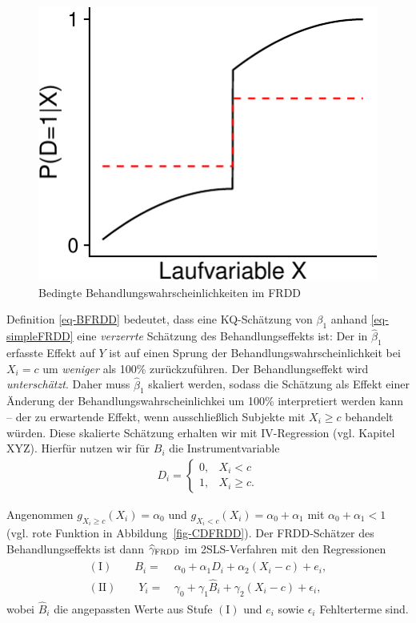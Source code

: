 \documentclass[
  a4paper,
  DIV=11,
  oneside]{scrreprt}
\begin{document}
\begin{figure}[t]

{\centering \includegraphics{RDD_files/figure-pdf/fig-FRDDprobD-1.pdf}

}

\caption{\label{fig-FRDDprobD}Bedingte Behandlungswahrscheinlichkeiten
im FRDD}

\end{figure}

Definition \eqref{eq-BFRDD} bedeutet, dass eine KQ-Schätzung von
\(\beta_1\) anhand \eqref{eq-simpleFRDD} eine \emph{verzerrte} Schätzung
des Behandlungseffekts ist: Der in \(\widehat{\beta}_1\) erfasste Effekt
auf \(Y\) ist auf einen Sprung der Behandlungswahrscheinlichkeit bei
\(X_i = c\) um \emph{weniger} als 100\% zurückzuführen. Der
Behandlungseffekt wird \emph{unterschätzt}. Daher muss
\(\widehat{\beta}_1\) skaliert werden, sodass die Schätzung als Effekt
einer Änderung der Behandlungswahrscheinlichkei um 100\% interpretiert
werden kann -- der zu erwartende Effekt, wenn ausschließlich Subjekte
mit \(X_i\geq c\) behandelt würden. Diese skalierte Schätzung erhalten
wir mit IV-Regression (vgl. Kapitel XYZ). Hierfür nutzen wir für \(B_i\)
die Instrumentvariable \begin{align*}
  D_i = \begin{cases}
    0, & X_i < c \\ 
    1, & X_i \geq c.
  \end{cases}
\end{align*}

Angenommen \(g_{X_i\geq c}(X_i) = \alpha_0\) und
\(g_{X_i<c}(X_i) = \alpha_0 + \alpha_1\) mit \(\alpha_0 + \alpha_1 < 1\)
(vgl. rote Funktion in Abbildung~\ref{fig-CDFRDD}). Der FRDD-Schätzer
des Behandlungseffekts ist dann \(\widehat{\gamma}_\textup{FRDD}\) im
2SLS-Verfahren mit den Regressionen \begin{align}
  \begin{split}
  (\mathrm{I})\qquad B_i =&\, \alpha_0 + \alpha_1 D_i + \alpha_2 (X_i - c) + e_i,\\
  (\mathrm{II})\qquad Y_i =&\, \gamma_0 + \gamma_1 \widehat{B}_i + \gamma_2 (X_i - c) + \epsilon_i,
  \end{split}\label{eq:FRDD_simpleIV}
\end{align} wobei \(\widehat{B}_i\) die angepassten Werte aus Stufe
\((\mathrm I)\) und \(e_i\) sowie \(\epsilon_i\) Fehlterterme sind.
\end{document}
